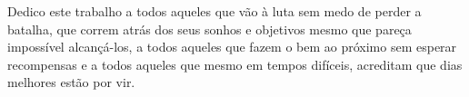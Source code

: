 \begin{dedicatoria}

Dedico este trabalho a todos aqueles que vão à luta sem medo de perder a batalha, que correm atrás dos  seus sonhos e objetivos mesmo que pareça impossível alcançá-los, a todos aqueles que fazem o bem ao próximo sem esperar recompensas e a todos aqueles que mesmo em tempos difíceis, acreditam que dias melhores estão por vir.

\end{dedicatoria}
